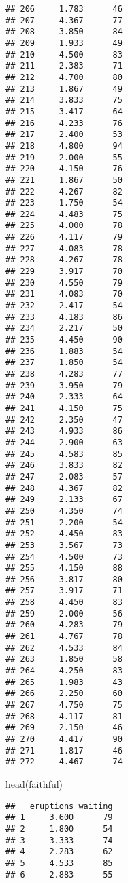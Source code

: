 \documentclass[
]{article}
\newenvironment{Shaded}{\begin{snugshade}}{\end{snugshade}}
\newcommand{\CommentTok}[1]{\textcolor[rgb]{0.56,0.35,0.01}{\textit{#1}}}
\newcommand{\FunctionTok}[1]{\textcolor[rgb]{0.00,0.00,0.00}{#1}}
\newcommand{\NormalTok}[1]{#1}
\newcommand{\OtherTok}[1]{\textcolor[rgb]{0.56,0.35,0.01}{#1}}
\newcommand{\SpecialCharTok}[1]{\textcolor[rgb]{0.00,0.00,0.00}{#1}}
\begin{document}
\begin{verbatim}
## 206     1.783      46
## 207     4.367      77
## 208     3.850      84
## 209     1.933      49
## 210     4.500      83
## 211     2.383      71
## 212     4.700      80
## 213     1.867      49
## 214     3.833      75
## 215     3.417      64
## 216     4.233      76
## 217     2.400      53
## 218     4.800      94
## 219     2.000      55
## 220     4.150      76
## 221     1.867      50
## 222     4.267      82
## 223     1.750      54
## 224     4.483      75
## 225     4.000      78
## 226     4.117      79
## 227     4.083      78
## 228     4.267      78
## 229     3.917      70
## 230     4.550      79
## 231     4.083      70
## 232     2.417      54
## 233     4.183      86
## 234     2.217      50
## 235     4.450      90
## 236     1.883      54
## 237     1.850      54
## 238     4.283      77
## 239     3.950      79
## 240     2.333      64
## 241     4.150      75
## 242     2.350      47
## 243     4.933      86
## 244     2.900      63
## 245     4.583      85
## 246     3.833      82
## 247     2.083      57
## 248     4.367      82
## 249     2.133      67
## 250     4.350      74
## 251     2.200      54
## 252     4.450      83
## 253     3.567      73
## 254     4.500      73
## 255     4.150      88
## 256     3.817      80
## 257     3.917      71
## 258     4.450      83
## 259     2.000      56
## 260     4.283      79
## 261     4.767      78
## 262     4.533      84
## 263     1.850      58
## 264     4.250      83
## 265     1.983      43
## 266     2.250      60
## 267     4.750      75
## 268     4.117      81
## 269     2.150      46
## 270     4.417      90
## 271     1.817      46
## 272     4.467      74
\end{verbatim}

\begin{Shaded}
\begin{Highlighting}[]
\FunctionTok{head}\NormalTok{(faithful)}
\end{Highlighting}
\end{Shaded}

\begin{verbatim}
##   eruptions waiting
## 1     3.600      79
## 2     1.800      54
## 3     3.333      74
## 4     2.283      62
## 5     4.533      85
## 6     2.883      55
\end{verbatim}

\begin{Shaded}
\end{Shaded}
\end{document}
